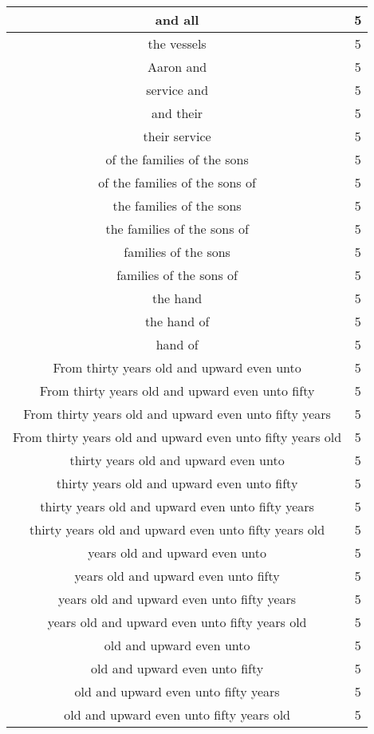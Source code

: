 \begin{center}
\begin{longtable}{|c|c|}
and all & 5\\ \hline 
the vessels & 5\\ \hline 
Aaron and & 5\\ \hline 
service and & 5\\ \hline 
and their & 5\\ \hline 
their service & 5\\ \hline 
of the families of the sons & 5\\ \hline 
of the families of the sons of & 5\\ \hline 
the families of the sons & 5\\ \hline 
the families of the sons of & 5\\ \hline 
families of the sons & 5\\ \hline 
families of the sons of & 5\\ \hline 
the hand & 5\\ \hline 
the hand of & 5\\ \hline 
hand of & 5\\ \hline 
From thirty years old and upward even unto & 5\\ \hline 
From thirty years old and upward even unto fifty & 5\\ \hline 
From thirty years old and upward even unto fifty years & 5\\ \hline 
From thirty years old and upward even unto fifty years old & 5\\ \hline 
thirty years old and upward even unto & 5\\ \hline 
thirty years old and upward even unto fifty & 5\\ \hline 
thirty years old and upward even unto fifty years & 5\\ \hline 
thirty years old and upward even unto fifty years old & 5\\ \hline 
years old and upward even unto & 5\\ \hline 
years old and upward even unto fifty & 5\\ \hline 
years old and upward even unto fifty years & 5\\ \hline 
years old and upward even unto fifty years old & 5\\ \hline 
old and upward even unto & 5\\ \hline 
old and upward even unto fifty & 5\\ \hline 
old and upward even unto fifty years & 5\\ \hline 
old and upward even unto fifty years old & 5\\ \hline 

\end{longtable}
\end{center}
